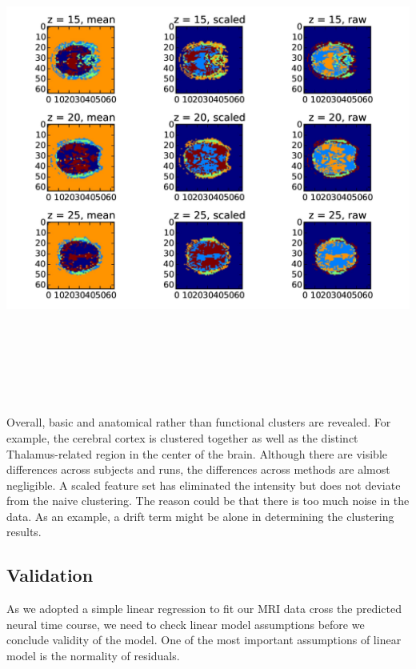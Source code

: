 \documentclass[11pt]{article}
\begin{document}
\includegraphics[width=16cm, height=16cm]{subject_across_methods.jpg}

Overall, basic and anatomical rather than functional clusters are revealed. For
example, the cerebral cortex is clustered together as well as the distinct
Thalamus-related region in the center of the brain.  Although there are visible
differences across subjects and runs, the differences across methods are almost
negligible. A scaled feature set has eliminated the intensity but does not
deviate from the naive clustering. The reason could be that there is too much
noise in the data. As an example, a drift term might be alone in determining the
clustering results. 

\subsection{Validation}

As we adopted a simple linear regression to fit our MRI data cross the predicted
neural time course, we need to check linear model assumptions before we conclude
validity of the model. One of the most important assumptions of linear model is
the normality of residuals.
\end{document}
